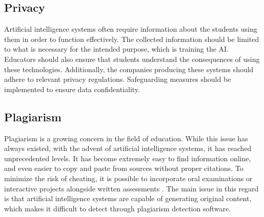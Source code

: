 \documentclass[a4paper,12pt]{article}
\begin{document}
\subsection{Privacy}
Artificial intelligence systems often require information about the students using them in order to function effectively. The collected information should be limited to what is necessary for the intended purpose, which is training the AI. Educators should also ensure that students understand the consequences of using these technologies\cite{barua2022artificial}. Additionally, the companies producing these systems should adhere to relevant privacy regulations. Safeguarding measures should be implemented to ensure data confidentiality.

\subsection{Plagiarism}
Plagiarism is a growing concern in the field of education. While this issue has always existed, with the advent of artificial intelligence systems, it has reached unprecedented levels. It has become extremely easy to find information online, and even easier to copy and paste from sources without proper citations. To minimize the risk of cheating, it is possible to incorporate oral examinations or interactive projects alongside written assessments \cite{king2023conversation}.
The main issue in this regard is that artificial intelligence systems are capable of generating original content, which makes it difficult to detect through plagiarism detection software.

\end{document}
